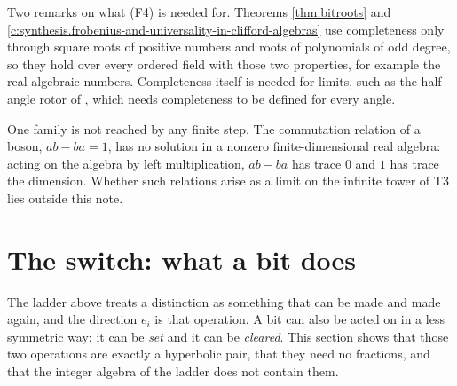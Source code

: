 \documentclass[11pt]{article}
\theoremstyle{definition}
\theoremstyle{plain}
\begin{document}
\label{c:note.geometry-first.setting-completion-number-systems-inside-6}
Two remarks on what (F4) is needed for. Theorems \ref{thm:bitroots} and \ref{c:synthesis.frobenius-and-universality-in-clifford-algebras} use completeness only through square roots of positive numbers and roots of polynomials of odd degree, so they hold over every ordered field with those two properties, for example the real algebraic numbers. Completeness itself is needed for limits, such as the half-angle rotor of \cite[Example 6.1]{ButlerT0}, which needs completeness to be defined for every angle.

One family is not reached by any finite step. The commutation relation of a boson, $ab - ba = 1$, has no solution in a nonzero finite-dimensional real algebra: acting on the algebra by left multiplication, $ab - ba$ has trace $0$ and $1$ has trace the dimension. Whether such relations arise as a limit on the infinite tower of T3 \cite{ButlerT3} lies outside this note.

\section{The switch: what a bit does}

\label{c:note.geometry-first.setting-switch-what-bit-does}
The ladder above treats a distinction as something that can be made and made again, and the direction $e_{i}$ is that operation. A bit can also be acted on in a less symmetric way: it can be \emph{set} and it can be \emph{cleared}. This section shows that those two operations are exactly a hyperbolic pair, that they need no fractions, and that the integer algebra of the ladder does not contain them.
\end{document}
